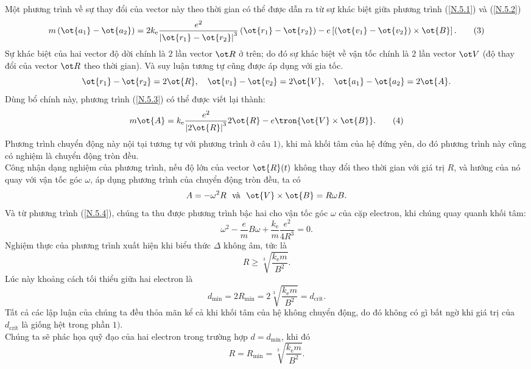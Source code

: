 \begin{loigiai}
\begin{enumerate}[1)]
     Một phương trình về sự thay đổi của vector này theo thời gian có thể được dẫn ra từ sự khác biệt giữa phương trình (\ref{N.5.1}) và (\ref{N.5.2})
     \[m\left(\ot{a_1}-\ot{a_2}\right)=2 k_{\mathrm{e}} \dfrac{e^{2}}{\left|\ot{r_1}-\ot{r_2}\right|^{3}}\left(\ot{r_1}-\ot{r_2}\right)-e\left[\left(\ot{v_1}-\ot{v_2}\right) \times \ot{B}\right].\tag{3}\label{N.5.3}\]
     Sự khác biệt của hai vector độ dời chính là $2$ lần vector $\ot R$ ở trên; do đó sự khác biệt về vận tốc chính là $2$ lần vector $\ot V$ (độ thay đổi của vector $\ot R$ theo thời gian). Và suy luận tương tự cũng được áp dụng với gia tốc.
     \[\ot{r_1} - \ot{r_2} =2 \ot{R}, \quad \ot{v_1}-\ot{v_2}=2 \ot{V}, \quad \ot{a_1}-\ot{a_2}=2 \ot{A}.\]
    Dùng bổ chính này, phương trình (\ref{N.5.3}) có thể được viết lại thành:
    \[m \ot{A}=k_{\mathrm{e}} \dfrac{e^{2}}{\left|2 \ot{R}\right|^{3}} 2 \ot{R} - e \tron{\ot{V} \times \ot{B}}. \tag{4}\label{N.5.4}\]
     Phương trình chuyển động này nội tại tương tự với phương trình ở câu $1)$, khi mà khối tâm của hệ đứng yên, do đó phương trình này cũng có nghiệm là chuyển động tròn đều.\\
   Công nhận dạng nghiệm của phương trình, nếu độ lớn của vector $\ot{R}(t)$ không thay đổi theo thời gian với giá trị $R$, và hướng của nó quay với vận tốc góc $\omega$, áp dụng phương trình của chuyển động tròn đều, ta có
    \[A=-\omega^{2} R \ {\text { và }} \  \ot{V} \times \ot{B}=R \omega B.\]
    Và từ phương trình (\ref{N.5.4}), chúng ta thu được phương trình bậc hai cho vận tốc góc $\omega$ của cặp electron, khi chúng quay quanh khối tâm:
    \[\omega^{2}-\dfrac{e}{m} B \omega + \dfrac{k_{\mathrm{e}}}{m} \dfrac{e^{2}}{4 R^{3}}=0. \tag{5}\label{N.5.5}\]
    Nghiệm thực của phương trình xuất hiện khi biểu thức $\Delta$ không âm, tức là
    \[R \geq \sqrt[3]{\dfrac{k_{\mathrm{e}} m}{B^{2}}}.\] 
      Lúc này khoảng cách tối thiểu giữa hai electron là 
      \[d_{\min }=2 R_{\min }=2 \sqrt[3]{\dfrac{k_{\mathrm{e}} m}{B^{2}}}=d_{\text{crit}}.\]
    Tất cả các lập luận của chúng ta đều thỏa mãn kể cả khi khối tâm của hệ không chuyển động, do đó không có gì bất ngờ khi giá trị của $d_{\mathrm{crit}}$ là giống hệt trong phần $1)$.\\
     Chúng ta sẽ phác họa quỹ đạo của hai electron trong trường hợp $d = d_{\min}$, khi đó
     \[R=R_{\min}=\sqrt[3]{\dfrac{k_{\mathrm{e} } m}{B^{2}}}.\]
     

\end{enumerate}
\end{loigiai}
